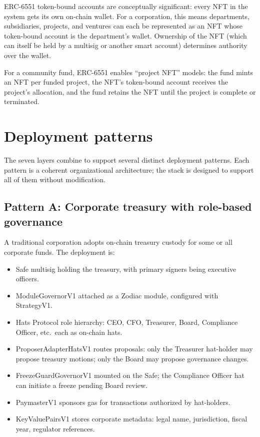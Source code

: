 \documentclass[11pt,letterpaper]{article}
\begin{document}
ERC-6551 token-bound accounts are conceptually significant: every NFT in the system gets its own on-chain wallet. For a corporation, this means departments, subsidiaries, projects, and ventures can each be represented as an NFT whose token-bound account is the department's wallet. Ownership of the NFT (which can itself be held by a multisig or another smart account) determines authority over the wallet.

For a community fund, ERC-6551 enables ``project NFT'' models: the fund mints an NFT per funded project, the NFT's token-bound account receives the project's allocation, and the fund retains the NFT until the project is complete or terminated.

\section{Deployment patterns}\label{sec:patterns}

The seven layers combine to support several distinct deployment patterns. Each pattern is a coherent organizational architecture; the stack is designed to support all of them without modification.

\subsection{Pattern A: Corporate treasury with role-based governance}

A traditional corporation adopts on-chain treasury custody for some or all corporate funds. The deployment is:

\begin{itemize}
\item Safe multisig holding the treasury, with primary signers being executive officers.
\item ModuleGovernorV1 attached as a Zodiac module, configured with StrategyV1.
\item Hats Protocol role hierarchy: CEO, CFO, Treasurer, Board, Compliance Officer, etc.\ each as on-chain hats.
\item ProposerAdapterHatsV1 routes proposals: only the Treasurer hat-holder may propose treasury motions; only the Board may propose governance changes.
\item FreezeGuardGovernorV1 mounted on the Safe; the Compliance Officer hat can initiate a freeze pending Board review.
\item PaymasterV1 sponsors gas for transactions authorized by hat-holders.
\item KeyValuePairsV1 stores corporate metadata: legal name, jurisdiction, fiscal year, regulator references.
\end{itemize}
\end{document}
